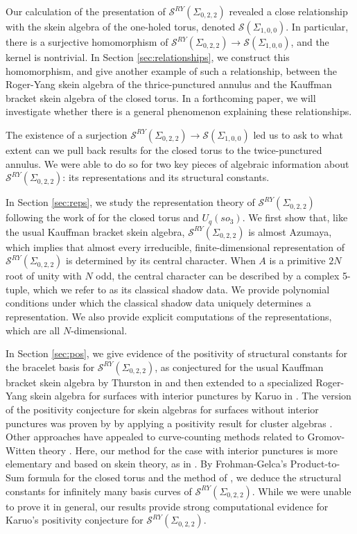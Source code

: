 \documentclass{article}
\newcommand{\san}{\Sigma_{0,2,2}}
\newcommand{\sto}{\Sigma_{1,0,0}}
\theoremstyle{definition}
\renewcommand{\san}{\Sigma_{0, 2, 2}}
\newcommand{\torus}{\Sigma_{1, 0, 0}}
\begin{document}
Our calculation of the presentation of $\mathcal S^{RY}(\san)$ revealed a close relationship with the skein algebra of the one-holed torus, denoted $\mathcal S(\torus)$. In particular, there is a surjective homomorphism  of $\mathcal S^{RY}(\san)\to \mathcal S(\sto)$, and the kernel is nontrivial. In Section \ref{sec:relationships}, we construct this homomorphism, and give another example of such a relationship, between the Roger-Yang skein algebra of the thrice-punctured annulus and the Kauffman bracket skein algebra of the closed torus. In a forthcoming paper, we will investigate whether there is a general phenomenon explaining these relationships.

The existence of a surjection $\mathcal S^{RY}(\san)\to \mathcal S(\sto)$ led us to ask to what extent can we pull back results for the closed torus to the twice-punctured annulus. We were able to do so for two key pieces of algebraic information about $\mathcal S^{RY}(\san)$: its representations and its structural constants.

In Section \ref{sec:reps}, we study the representation theory of $\mathcal S^{RY}(\san)$ following the work of \cite{FKBLUnicity, TakenovReps, HavlicekPosta}  for the closed torus and $U_q(so_3)$.  We first show that, like the usual Kauffman bracket skein algebra,  $\mathcal S^{RY}(\san)$ is almost Azumaya, which implies that almost every irreducible, finite-dimensional representation of $\mathcal S^{RY}(\san)$ is determined by its central character.   When $A$ is a primitive $2N$ root of unity with $N$ odd,  the central character can be described by a complex 5-tuple, which we refer to as its classical shadow data.  We provide  polynomial conditions under which the classical shadow data uniquely determines a representation.  We also provide explicit computations of the representations, which are all $N$-dimensional.   

In Section \ref{sec:pos}, we give evidence of the positivity of structural constants for the bracelet basis for $\mathcal S^{RY}(\san)$, as conjectured for the usual Kauffman bracket skein algebra by Thurston in \cite{ThurstonPositive} and then extended to a specialized Roger-Yang skein algebra for surfaces with interior punctures by Karuo in \cite{KaruoPositive}. The version of the  positivity conjecture for skein algebras for surfaces without interior punctures was proven by \cite{MandelQinPositive} by applying a positivity result for cluster algebras \cite{GHKPositive}.  Other approaches have appealed to curve-counting methods related to Gromov-Witten theory \cite{BousseauPositive}.  Here, our method for the case with interior punctures is more elementary and based on skein theory, as in \cite{LePositive, TTYPositive, Rhea4puncsphere}.   By Frohman-Gelca's Product-to-Sum formula for the closed torus \cite{FrohmanGelca} and  the method of \cite{SikiFast}, we deduce the structural constants for infinitely many basis curves of $\mathcal S^{RY}(\san)$. While we were unable to prove it in general, our  results provide strong computational evidence for Karuo's positivity conjecture for $\mathcal S^{RY}(\san)$.   
  
\end{document}
